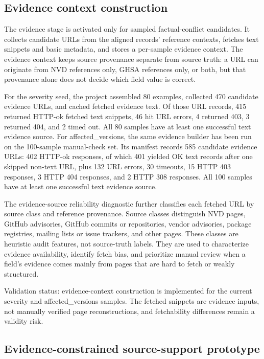 \subsection{Evidence context construction}

The evidence stage is activated only for sampled factual-conflict candidates. It collects candidate URLs from the aligned records' reference contexts, fetches text snippets and basic metadata, and stores a per-sample evidence context. The evidence context keeps source provenance separate from source truth: a URL can originate from NVD references only, GHSA references only, or both, but that provenance alone does not decide which field value is correct.

For the severity seed, the project assembled 80 examples, collected 470 candidate evidence URLs, and cached fetched evidence text. Of those URL records, 415 returned HTTP-ok fetched text snippets, 46 hit URL errors, 4 returned 403, 3 returned 404, and 2 timed out. All 80 samples have at least one successful text evidence source. For affected\_versions, the same evidence builder has been run on the 100-sample manual-check set. Its manifest records 585 candidate evidence URLs: 402 HTTP-ok responses, of which 401 yielded OK text records after one skipped non-text URL, plus 132 URL errors, 30 timeouts, 15 HTTP 403 responses, 3 HTTP 404 responses, and 2 HTTP 308 responses. All 100 samples have at least one successful text evidence source.

The evidence-source reliability diagnostic further classifies each fetched URL by source class and reference provenance. Source classes distinguish NVD pages, GitHub advisories, GitHub commits or repositories, vendor advisories, package registries, mailing lists or issue trackers, and other pages. These classes are heuristic audit features, not source-truth labels. They are used to characterize evidence availability, identify fetch bias, and prioritize manual review when a field's evidence comes mainly from pages that are hard to fetch or weakly structured.

Validation status: evidence-context construction is implemented for the current severity and affected\_versions samples. The fetched snippets are evidence inputs, not manually verified page reconstructions, and fetchability differences remain a validity risk.

\subsection{Evidence-constrained source-support prototype}

